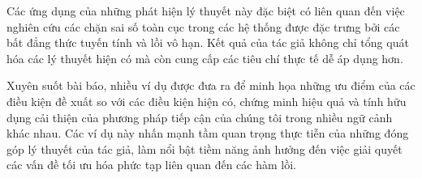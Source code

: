 Các ứng dụng của những phát hiện lý thuyết này đặc biệt có liên quan đến việc nghiên cứu các chặn sai số toàn cục trong các hệ thống được đặc trưng bởi các bất đẳng thức tuyến tính và lồi vô hạn. Kết quả của tác giả không chỉ tổng quát hóa các lý thuyết hiện có mà còn cung cấp các tiêu chí thực tế dễ áp dụng hơn.

Xuyên suốt bài báo, nhiều ví dụ được đưa ra để minh họa những ưu điểm của các điều kiện đề xuất so với các điều kiện hiện có, chứng minh hiệu quả và tính hữu dụng cải thiện của phương pháp tiếp cận của chúng tôi trong nhiều ngữ cảnh khác nhau. Các ví dụ này nhấn mạnh tầm quan trọng thực tiễn của những đóng góp lý thuyết của tác giả, làm nổi bật tiềm năng ảnh hưởng đến việc giải quyết các vấn đề tối ưu hóa phức tạp liên quan đến các hàm lồi.